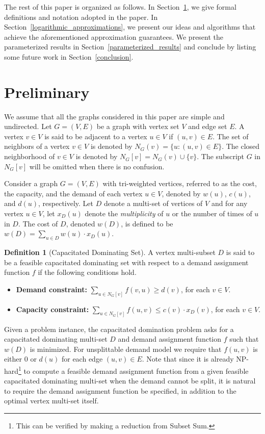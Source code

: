 \documentclass[a4paper,11pt]{article}
\theoremstyle{definition}
\newtheorem{definition}{Definition}
\begin{document}
\smallskip

The rest of this paper is organized as follows. In Section~\ref{preliminary}, we give formal definitions and notation adopted in the paper. In Section~\ref{logarithmic_approximations}, we present our ideas and algorithms that achieve the aforementioned approximation guarantees. We present the parameterized results in Section~\ref{parameterized_results} and conclude by listing some future work in Section~\ref{conclusion}.



\section{Preliminary} \label{preliminary}

We assume that all the graphs considered in this paper are simple and undirected. Let $G=(V,E)$ be a graph with vertex set $V$ and edge set $E$. A vertex $v \in V$ is said to be adjacent to a vertex $u \in V$ if $(u,v) \in E$. The set of neighbors of a vertex $v \in V$ is denoted by $N_G(v) = \{u:(u,v) \in E\}$. The closed neighborhood of $v \in V$ is denoted by $N_G[v] = N_G(v) \cup \{v\}$.  The subscript $G$ in $N_G[v]$ will be omitted when there is no confusion.

\smallskip

Consider a graph $G=(V,E)$ with tri-weighted vertices, referred to as the cost, the capacity, and the demand of each vertex $u \in V$, denoted by $w(u)$, $c(u)$, and $d(u)$, respectively. Let $D$ denote a multi-set of vertices of $V$ and for any vertex $u \in V$, let $x_D(u)$ denote the {\it multiplicity} of $u$ or the number of times of $u$ in $D$.
The cost of $D$, denoted $w(D)$, is defined to be $w(D)= \sum_{u\in D} w(u)\cdot x_D(u)$.

\begin{definition}[Capacitated Dominating Set]
A vertex multi-subset $D$ is said to be a feasible capacitated dominating set with respect to a demand assignment function $f$ if the following conditions hold.
\begin{itemize}
    \item {\bf Demand constraint:} $\sum_{u \in N_G[v]}f(v,u) \ge d(v)$, for each $v \in V$.
    \item {\bf Capacity constraint:} $\sum_{u \in N_G[v]}f(u,v) \le c(v)\cdot x_D(v)$, for each $v \in V$.
\end{itemize}
\end{definition}

Given a problem instance, the capacitated domination problem asks for a capacitated dominating multi-set $D$ and demand assignment function $f$ such that $w(D)$ is minimized. For unsplittable demand model we require that $f(u,v)$ is either $0$ or $d(u)$ for each edge $(u,v) \in E$. Note that since it is already NP-hard\footnote{This can be verified by making a reduction from {\sc Subset Sum}.} to compute a feasible demand assignment function from a given feasible capacitated dominating multi-set when the demand cannot be split, it is natural to require the demand assignment function be specified, in addition to the optimal vertex multi-set itself.
\end{document}
